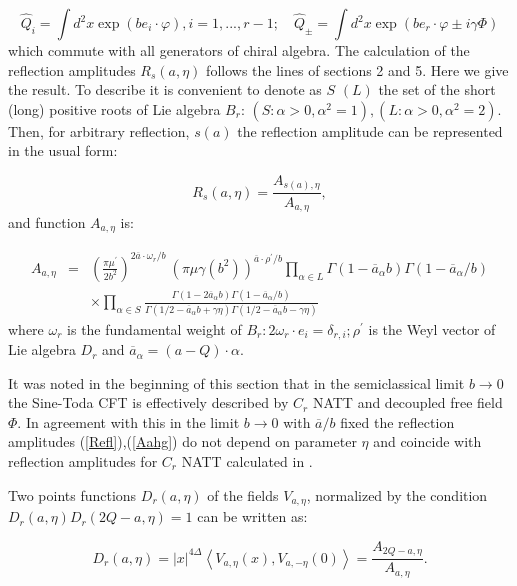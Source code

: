 \documentclass[a4paper,12pt]{article}
\begin{document}
\begin{displaymath}
\widehat{Q}_i=\int d^2x\exp (be_i\cdot \varphi ),i=1,...,r-1;\quad \widehat{Q
}_{\pm }=\int d^2x\exp (be_r\cdot \varphi \pm i\gamma \Phi )  
\end{displaymath}
which commute with all generators of chiral algebra. The calculation of the
reflection amplitudes $R_s(a,\eta )$ follows the lines of sections 2 and 5.
Here we give the result. To describe it is convenient to denote as $S$ $(L)$
the set of the short (long) positive roots of Lie algebra $B_r$: $(S:\alpha
>0,\alpha ^2=1),(L:\alpha >0,\alpha ^2=2)$. Then, for arbitrary reflection, 
$s(a)$ the reflection amplitude can be represented in the usual form:

\begin{equation}
R_s(a,\eta )=\frac{A_{s(a),\eta }}{A_{a,\eta }},  \label{Refl}
\end{equation}
and function $A_{a,\eta }$ is:

\begin{eqnarray}
A_{a,\eta } &=&\left( \frac{\pi \mu ^{\prime }}{2b^2}\right) ^{2\overline{a}
\cdot \omega _r/b}\ \left( \pi \mu \gamma (b^2)\right) ^{\overline{a}\cdot
\rho ^{\prime }/b}
 \prod\limits_{\alpha \in L}\Gamma (1-\overline{a}_\alpha b)\Gamma
(1-\overline{a}_\alpha /b) 
 \nonumber \\
&& \times
\prod\limits_{\alpha \in S}\frac{\Gamma (1-2\overline{a}
_\alpha b)\Gamma (1-\overline{a}_\alpha /b)}{\Gamma (1/2-\overline{a}_\alpha
b+\gamma \eta )\Gamma (1/2-\overline{a}_\alpha b-\gamma \eta )} 
\label{Aahg}
\end{eqnarray}
where $\omega _r$ is the fundamental weight of $B_r:2\omega _r\cdot
e_i=\delta _{r,i};\rho ^{\prime }$ is the Weyl vector of Lie algebra $D_r$
and $\overline{a}_\alpha =(a-Q)\cdot \alpha $.

It was noted in the beginning of this section that in the semiclassical limit 
$b\to 0$ the Sine-Toda CFT is effectively described by $C_r$ NATT and decoupled free field $\Phi$. In agreement with this in the limit $b\to 0$ with 
$\overline{a}/b$ fixed the reflection amplitudes (\ref{Refl}),(\ref{Aahg}) do 
not depend on parameter $\eta$ and coincide with reflection amplitudes for 
$C_r$ NATT calculated in \cite{BFAK}. 

Two points functions $D_r(a,\eta )$ of the fields $V_{a,\eta }$, normalized
by the condition $D_r(a,\eta )D_r(2Q-a,\eta )=1$ can be written as:

\begin{equation}
D_r(a,\eta )=\left| x\right| ^{4\Delta }\left\langle V_{a,\eta
}(x),V_{a,-\eta }(0)\right\rangle =\frac{A_{2Q-a,\eta }}{A_{a,\eta }}.
\label{Tpfr}
\end{equation}
\end{document}
